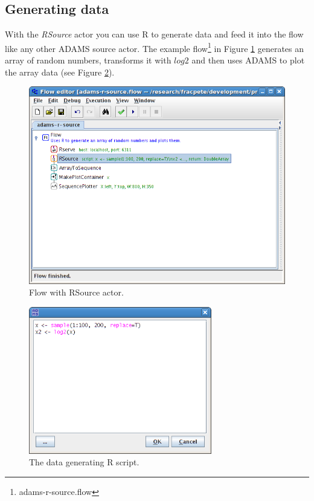 \documentclass[a4paper]{book}
\begin{document}
\subsection{Generating data}
With the \textit{RSource} actor you can use R to generate data and feed it
into the flow like any other ADAMS source actor. The example 
flow\footnote{adams-r-source.flow} in Figure \ref{source-flow} generates
an array of random numbers, transforms it with $log2$ and then uses ADAMS
to plot the array data (see Figure \ref{source-script}).
\begin{figure}[ht]
	\centering
	\includegraphics[width=\textwidth]{images/source-flow.png}
	\caption{Flow with RSource actor.}
	\label{source-flow}
\end{figure}
\begin{figure}[ht]
	\centering
	\includegraphics[width=8cm]{images/source-script.png}
	\caption{The data generating R script.}
	\label{source-script}
\end{figure}
\end{document}
